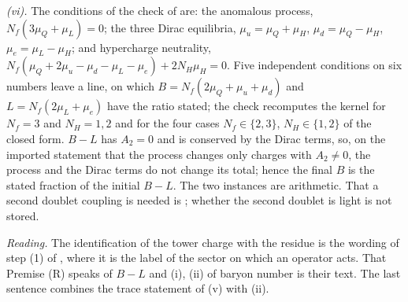\emph{(vi).} The conditions of the check of  are: the anomalous process, $N_{f}(3\mu_{Q} + \mu_{L}) = 0$; the three Dirac equilibria, $\mu_{u} = \mu_{Q} + \mu_{H}$, $\mu_{d} = \mu_{Q} - \mu_{H}$, $\mu_{e} = \mu_{L} - \mu_{H}$; and hypercharge neutrality, $N_{f}(\mu_{Q} + 2\mu_{u} - \mu_{d} - \mu_{L} - \mu_{e}) + 2N_{H}\mu_{H} = 0$. Five independent conditions on six numbers leave a line, on which $B = N_{f}(2\mu_{Q} + \mu_{u} + \mu_{d})$ and $L = N_{f}(2\mu_{L} + \mu_{e})$ have the ratio stated; the check recomputes the kernel for $N_{f} = 3$ and $N_{H} = 1, 2$ and for the four cases $N_{f} \in \{2, 3\}$, $N_{H} \in \{1, 2\}$ of the closed form. $B - L$ has $A_{2} = 0$ and is conserved by the Dirac terms, so, on the imported statement that the process changes only charges with $A_{2} \neq 0$, the process and the Dirac terms do not change its total; hence the final $B$ is the stated fraction of the initial $B - L$. The two instances are arithmetic. That a second doublet coupling is needed is ; whether the second doublet is light is not stored.

\emph{Reading.} The identification of the tower charge with the residue is the wording of step (1) of , where it is the label of the sector on which an operator acts. That Premise (R) speaks of $B - L$ and (i), (ii) of baryon number is their text. The last sentence combines the trace statement of (v) with (ii).

